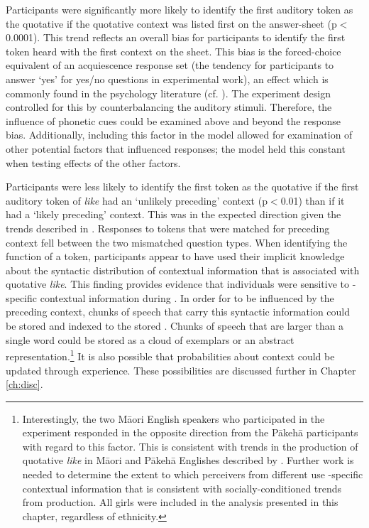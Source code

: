 Participants were significantly more likely to identify the first auditory token as the quotative if the quotative context was listed first on the answer-sheet (p$<$0.0001). This trend reflects an overall bias for participants to identify the first token heard with the first context on the sheet. This bias is the forced-choice equivalent of an acquiescence response set (the tendency for participants to answer `yes' for yes/no questions in experimental work), an effect which is commonly found in the psychology literature (cf. \cite{bentleretal1971}). The experiment design controlled for this by counterbalancing the auditory stimuli. Therefore, the influence of phonetic cues could be examined above and beyond the response bias. Additionally, including this factor in the model allowed for examination of other potential factors that influenced responses; the model held this constant when testing effects of the other factors. 



Participants were less likely to identify the first token as the quotative if the first auditory token of \textit{like} had an `unlikely preceding' context (p$<$0.01) than if it had a `likely preceding' context. This was in the expected direction given the trends described in \citet{buchstallerdarcy2009}. Responses to tokens that were matched for preceding context fell between the two mismatched question types. When identifying the function of a token, participants appear to have used their implicit knowledge about the syntactic distribution of contextual information that is associated with quotative \textit{like}. This finding provides evidence that individuals were sensitive to -specific contextual information during . In order for  to be influenced by the preceding context, chunks of speech that carry this syntactic information could be stored and indexed to the stored . Chunks of speech that are larger than a single word could be stored as a cloud of exemplars or an abstract representation.\footnote{Interestingly, the two M\=aori English speakers who participated in the experiment responded in the opposite direction from the P\=akeh\=a participants with regard to this factor. This is consistent with trends in the production of quotative \textit{like} in M\=aori and P\=akeh\=a Englishes described by \citet{darcy2010}. Further work is needed to determine the extent to which perceivers from different  use -specific contextual information that is consistent with socially-conditioned trends from production. All girls were included in the analysis presented in this chapter, regardless of ethnicity.} It is also possible that probabilities about context could be updated through experience. These possibilities are discussed further in Chapter \ref{ch:disc}.


